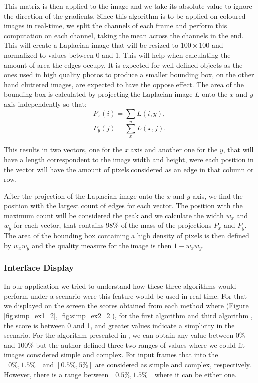 This matrix is then applied to the image and we take its absolute value to ignore the direction of the gradients. Since this algorithm is to be applied on coloured images in real-time, we split the channels of each frame and perform this computation on each channel, taking the mean across the channels in the end. This will create a Laplacian image that will be resized to $100\times100$ and normalized to values between 0 and 1. This will help when calculating the amount of area the edges occupy. It is expected for well defined objects as the ones used in high quality photos to produce a smaller bounding box, on the other hand cluttered images, are expected to have the oppose effect.
The area of the bounding box is calculated by projecting the Laplacian image $L$ onto the $x$ and $y$ axis independently so that:
\begin{equation}
P_{x}(i) = \sum_{y} L(i,y),
\end{equation}
\begin{equation}
P_{y}(j) = \sum_{x} L(x,j).
\end{equation}

This results in two vectors, one for the $x$ axis and another one for the $y$, that will have a length correspondent to the image width and height, were each position in the vector will have the amount of pixels considered as an edge in that column or row.

After the projection of the Laplacian image onto the $x$ and $y$ axis, we find the position with the largest count of edges for each vector. The position with the maximum count will be considered the peak and we calculate the width $w_{x}$ and $w_{y}$ for each vector, that contains 98\% of the mass of the projections $P_{x}$ and $P_{y}$. The area of the bounding box containing a high density of pixels is then defined by $w_{x}w_{y}$ and the quality measure for the image is then $1-w_{x}w_{y}$.

\subsubsection{Interface Display}

In our application we tried to understand how these three algorithms would perform under a scenario were this feature would be used in real-time. For that we displayed on the screen the scores obtained from each method where (Figure \ref{fig:simp_ex1_2}, \ref{fig:simp_ex2_2}), for the first algorithm \cite{kaoautomatic} and third algorithm \cite{ke2006design}, the score is between 0 and 1, and greater values indicate a simplicity in the scenario. 
For the algorithm presented in \cite{luo2008photo}, we can obtain any value between 0\% and 100\% but the author defined three two ranges of values where we could fit images considered simple and complex. For input frames that into the $[0\%,1.5\%]$ and $[0.5\%,5\%]$ are considered as simple and complex, respectively. However, there is a range between $[0.5\%,1.5\%]$ where it can be either one.
 
